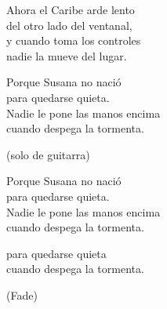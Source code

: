 \begin{lyrics}
Ahora el Caribe arde lento\\
del otro lado del ventanal,\\
y cuando toma los controles\\
nadie la mueve del lugar.

Porque Susana no nació\\
para quedarse quieta.\\
Nadie le pone las manos encima\\
cuando despega la tormenta.

(solo de guitarra)

Porque Susana no nació\\
para quedarse quieta.\\
Nadie le pone las manos encima\\
cuando despega la tormenta.

para quedarse quieta\\
cuando despega la tormenta.

(Fade)

\end{lyrics}

